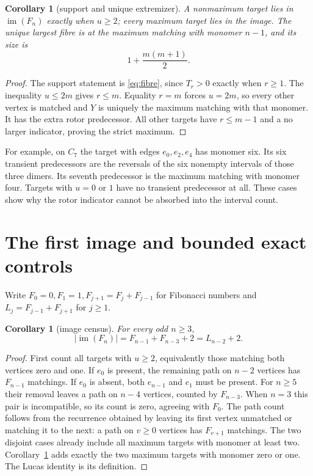 \documentclass[a4paper,10pt]{amsart}
\newtheorem{corollary}[theorem]{Corollary}
\theoremstyle{remark}
\newcommand{\im}{\operatorname{im}}
\begin{document}
\begin{corollary}[support and unique extremizer]\label{cor:max}
A nonmaximum target lies in $\im(F_n)$ exactly when $u\ge2$; every
maximum target lies in the image. The unique largest fibre is at the
maximum matching with monomer $n-1$, and its size is
\begin{equation}\label{eq:max}
 1+\frac{m(m+1)}2.
\end{equation}
\end{corollary}
\begin{proof}
The support statement is \eqref{eq:fibre}, since $T_r>0$ exactly when
$r\ge1$. The inequality $u\le2m$ gives $r\le m$. Equality $r=m$
forces $u=2m$, so every other vertex is matched and $Y$ is uniquely the
maximum matching with that monomer. It has the extra rotor predecessor.
All other targets have $r\le m-1$ and a no larger indicator, proving
the strict maximum.
\end{proof}

For example, on $C_7$ the target with edges $e_0,e_2,e_4$ has monomer
six. Its six transient predecessors are the reversals of the six nonempty
intervals of those three dimers. Its seventh predecessor is the maximum
matching with monomer four. Targets with $u=0$ or $1$ have no transient
predecessor at all. These cases show why the rotor indicator cannot be
absorbed into the interval count.

\section{The first image and bounded exact controls}
Write $F_0=0,F_1=1,F_{j+1}=F_j+F_{j-1}$ for Fibonacci numbers and
$L_j=F_{j-1}+F_{j+1}$ for $j\ge1$.
\begin{corollary}[image census]\label{cor:image}
For every odd $n\ge3$,
\begin{equation}\label{eq:image}
 |\im(F_n)|=F_{n-1}+F_{n-3}+2=L_{n-2}+2.
\end{equation}
\end{corollary}
\begin{proof}
First count all targets with $u\ge2$, equivalently those matching both
vertices zero and one. If $e_0$ is present, the remaining path on $n-2$
vertices has $F_{n-1}$ matchings. If $e_0$ is absent, both $e_{n-1}$ and
$e_1$ must be present. For $n\ge5$ their removal leaves a path on $n-4$
vertices, counted by $F_{n-3}$. When $n=3$ this pair is incompatible, so
its count is zero, agreeing with $F_0$. The path count follows from the
recurrence obtained by leaving its first vertex unmatched or matching it
to the next: a path on $v\ge0$ vertices has $F_{v+1}$ matchings.
The two disjoint cases already include all maximum targets with monomer
at least two. Corollary~\ref{cor:max} adds exactly the two maximum
targets with monomer zero or one. The Lucas identity is its definition.
\end{proof}
\end{document}
